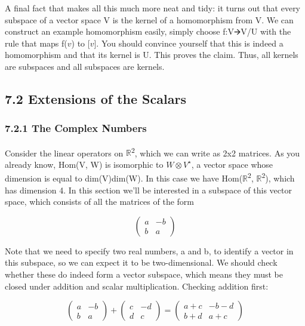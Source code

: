 \documentclass[oneside,english]{amsbook}
\numberwithin{section}{chapter}
\theoremstyle{plain}
\theoremstyle{definition}
\begin{document}
A final fact that makes all this much more neat and tidy: it turns out
that every subspace of a vector space V is the kernel of a homomorphism
from V. We can construct an example homomorphism easily, simply choose
f:V🡪V/U with the rule that maps f($v$) to {[}$v${]}. You should
convince yourself that this is indeed a homomorphism and that its kernel
is U. This proves the claim. Thus, all kernels are subspaces and all
subspaces are kernels.

\subsection{7.2 Extensions of the
	Scalars}\label{extensions-of-the-scalars}

\subsubsection{7.2.1 The Complex Numbers}\label{the-complex-numbers}

Consider the linear operators on $\mathbb{R}$\textsuperscript{2}, which we
can write as 2x2 matrices. As you already know, Hom(V, W) is isomorphic
to $W\otimes V^\star$, a vector space whose dimension is equal to dim(V)dim(W). In
this case we have Hom($\mathbb{R}$\textsuperscript{2},
$\mathbb{R}$\textsuperscript{2}), which has dimension 4. In this section
we'll be interested in a subspace of this vector space, which consists
of all the matrices of the form

\[\begin{pmatrix}
	a & - b \\
	b & a
\end{pmatrix}\]

Note that we need to specify two real numbers, a and b, to identify a
vector in this subspace, so we can expect it to be two-dimensional. We
should check whether these do indeed form a vector subspace, which means
they must be closed under addition and scalar multiplication. Checking
addition first:

\[\begin{pmatrix}
	a & - b \\
	b & a
\end{pmatrix} + \begin{pmatrix}
	c & - d \\
	d & c
\end{pmatrix} = \begin{pmatrix}
	a + c & - b - d \\
	b + d & a + c
\end{pmatrix}\]
\end{document}
